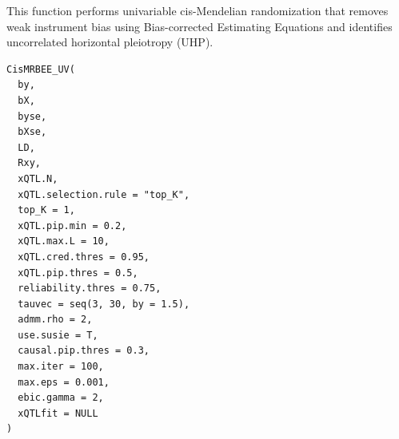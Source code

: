 \documentclass[a4paper]{book}
\begin{document}
%
\begin{Description}
This function performs univariable cis-Mendelian randomization that removes weak instrument bias using Bias-corrected Estimating Equations and identifies uncorrelated horizontal pleiotropy (UHP).
\end{Description}
%
\begin{Usage}
\begin{verbatim}
CisMRBEE_UV(
  by,
  bX,
  byse,
  bXse,
  LD,
  Rxy,
  xQTL.N,
  xQTL.selection.rule = "top_K",
  top_K = 1,
  xQTL.pip.min = 0.2,
  xQTL.max.L = 10,
  xQTL.cred.thres = 0.95,
  xQTL.pip.thres = 0.5,
  reliability.thres = 0.75,
  tauvec = seq(3, 30, by = 1.5),
  admm.rho = 2,
  use.susie = T,
  causal.pip.thres = 0.3,
  max.iter = 100,
  max.eps = 0.001,
  ebic.gamma = 2,
  xQTLfit = NULL
)
\end{verbatim}
\end{Usage}
%
\end{document}

